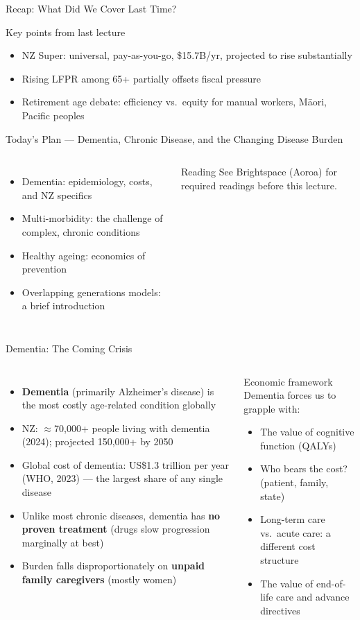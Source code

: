 \documentclass[aspectratio=169, 12pt]{beamer}
\newcommand{\recapslide}[1]{%
  \begin{frame}{Recap: What Did We Cover Last Time?}
    \begin{block}{Key points from last lecture}
      \begin{itemize}#1\end{itemize}
    \end{block}
  \end{frame}}
\newcommand{\planslide}[2]{%
  \begin{frame}{Today's Plan — #1}
    \begin{columns}
      \column{0.6\textwidth}
      \begin{itemize}#2\end{itemize}
      \column{0.38\textwidth}
      \begin{alertblock}{Reading}
        \footnotesize See Brightspace (Aoroa) for required readings before this lecture.
      \end{alertblock}
    \end{columns}
  \end{frame}}
\begin{document}

\recapslide{
  \item NZ Super: universal, pay-as-you-go, \$15.7B/yr, projected to rise substantially
  \item Rising LFPR among 65+ partially offsets fiscal pressure
  \item Retirement age debate: efficiency vs.\ equity for manual workers, Māori, Pacific peoples
}

\planslide{Dementia, Chronic Disease, and the Changing Disease Burden}{
  \item Dementia: epidemiology, costs, and NZ specifics
  \item Multi-morbidity: the challenge of complex, chronic conditions
  \item Healthy ageing: economics of prevention
  \item Overlapping generations models: a brief introduction
}

\begin{frame}{Dementia: The Coming Crisis}
  \begin{columns}
      \begin{itemize}
        \item \textbf{Dementia} (primarily Alzheimer's disease) is the most costly age-related
              condition globally
        \item NZ: $\approx$70,000+ people living with dementia (2024); projected 150,000+ by 2050
        \item Global cost of dementia: US\$1.3 trillion per year (WHO, 2023) --- the largest
              share of any single disease
        \item Unlike most chronic diseases, dementia has \textbf{no proven treatment}
              (drugs slow progression marginally at best)
        \item Burden falls disproportionately on \textbf{unpaid family caregivers} (mostly women)
      \end{itemize}
      \begin{alertblock}{Economic framework}
        Dementia forces us to grapple with:
        \begin{itemize}
          \item The value of cognitive function (QALYs)
          \item Who bears the cost? (patient, family, state)
          \item Long-term care vs.\ acute care: a different cost structure
          \item The value of end-of-life care and advance directives
        \end{itemize}
      \end{alertblock}
  \end{columns}
\end{frame}
\end{document}
